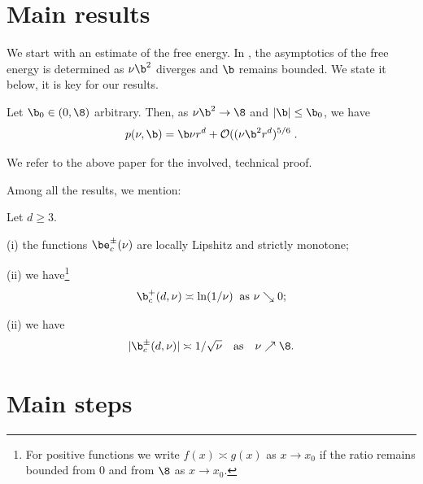 \section{Main results}

We start with an estimate of the free energy.
In \cite[Th. 5.3.1]{CYBMPO2}, the asymptotics of the free energy is determined as $\nu  \b^2 $ diverges and $\b$ remains bounded. We state it below, it is key for our results.
\begin{lemma}\label{lem:boundfe}
Let $\b_0 \in (0,\8)$ arbitrary. Then, as $\nu  \b^2 \to \8$ and $|\b| \leq \b_0$, we have
$$ p(\nu,\b) = \b \nu r^d + {\cal O}((\nu  \b^2 r^d)^{5/6}\;.$$
\end{lemma}
\noindent We refer to the above paper for the involved, technical proof.


Among all the results, we mention:
\begin{theorem}
Let $d \geq 3$.

(i) the functions $\be_c^\pm(\nu)$ are locally Lipshitz and strictly monotone;

(ii) we have\footnote{For positive functions we write $f(x) \asymp g(x)$ as $x \to x_0$ if the ratio remains bounded  from 0 and from $\8$  as $x \to x_0$.}
 \begin{equation} \label{eq:decay*of*b_c+}
\b^+_c (d, \nu) \asymp \ln (1/\nu)
\; \; \mbox{as $\nu \searrow 0$};
\end{equation}


(ii) we have 
\begin{equation} \label{eq:decay*of*b_c2}
|\b^\pm_c (d,\nu)| \asymp 1/\sqrt{\nu} \quad {\rm as } \quad \nu \nearrow \8.
\end{equation}
\end{theorem} 
\section{Main steps}

